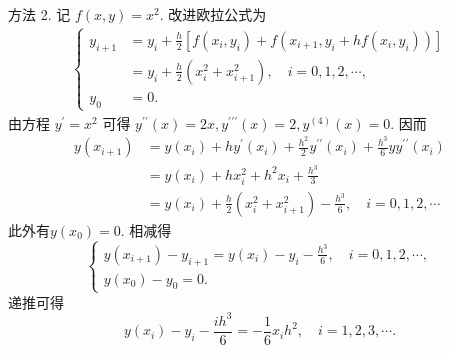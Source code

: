 \begin{tcolorbox}[enhanced,colback=8,colframe=7,breakable,coltitle=green!25!black,title=2024]
方法 2. 记 $ f(x, y)=x^{2} $. 改进欧拉公式为
$$
\begin{array}{l}
\left\{\begin{aligned}
y_{i+1} & =y_{i}+\frac{h}{2}\left[f\left(x_{i}, y_{i}\right)+f\left(x_{i+1}, y_{i}+h f\left(x_{i}, y_{i}\right)\right)\right] \\
& =y_{i}+\frac{h}{2}\left(x_{i}^{2}+x_{i+1}^{2}\right), \quad i=0,1,2, \cdots, \\
y_{0} & =0 .
\end{aligned}\right.
\end{array}
$$
由方程 $ y^{\prime}=x^{2} $ 可得 $ y^{\prime \prime}(x)=2 x, y^{\prime \prime \prime}(x)=2, y^{(4)}(x)=0 $. 因而
$$
\begin{aligned}
y\left(x_{i+1}\right) & =y\left(x_{i}\right)+h y^{\prime}\left(x_{i}\right)+\frac{h^{2}}{2} y^{\prime \prime}\left(x_{i}\right)+\frac{h^{3}}{6} y y^{\prime \prime}\left(x_{i}\right) \\
& =y\left(x_{i}\right)+h x_{i}^{2}+h^{2} x_{i}+\frac{h^{3}}{3} \\
& =y\left(x_{i}\right)+\frac{h}{2}\left(x_{i}^{2}+x_{i+1}^{2}\right)-\frac{h^{3}}{6}, \quad i=0,1,2, \cdots
\end{aligned}
$$
此外有$y\left(x_{0}\right)=0 .$ 相减得
$$
\left\{\begin{array}{l}
y\left(x_{i+1}\right)-y_{i+1}=y\left(x_{i}\right)-y_{i}-\frac{h^{3}}{6}, \quad i=0,1,2, \cdots, \\
y\left(x_{0}\right)-y_{0}=0 .
\end{array}\right.
$$
递推可得
$$
y\left(x_{i}\right)-y_{i}-\frac{i h^{3}}{6}=-\frac{1}{6} x_{i} h^{2}, \quad i=1,2,3, \cdots .
$$
\end{tcolorbox}
